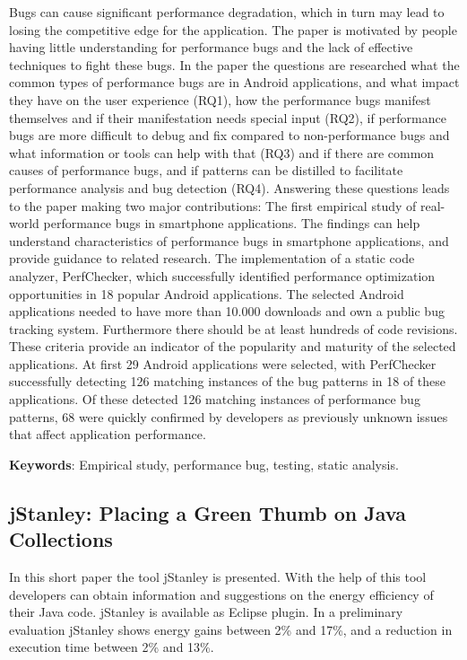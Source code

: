 \documentclass[]{book}
\begin{document}
Bugs can cause significant performance degradation, which in turn may
lead to losing the competitive edge for the application. The paper is
motivated by people having little understanding for performance bugs and
the lack of effective techniques to fight these bugs. In the paper the
questions are researched what the common types of performance bugs are
in Android applications, and what impact they have on the user
experience (RQ1), how the performance bugs manifest themselves and if
their manifestation needs special input (RQ2), if performance bugs are
more difficult to debug and fix compared to non-performance bugs and
what information or tools can help with that (RQ3) and if there are
common causes of performance bugs, and if patterns can be distilled to
facilitate performance analysis and bug detection (RQ4). Answering these
questions leads to the paper making two major contributions: The first
empirical study of real-world performance bugs in smartphone
applications. The findings can help understand characteristics of
performance bugs in smartphone applications, and provide guidance to
related research. The implementation of a static code analyzer,
PerfChecker, which successfully identified performance optimization
opportunities in 18 popular Android applications. The selected Android
applications needed to have more than 10.000 downloads and own a public
bug tracking system. Furthermore there should be at least hundreds of
code revisions. These criteria provide an indicator of the popularity
and maturity of the selected applications. At first 29 Android
applications were selected, with PerfChecker successfully detecting 126
matching instances of the bug patterns in 18 of these applications. Of
these detected 126 matching instances of performance bug patterns, 68
were quickly confirmed by developers as previously unknown issues that
affect application performance.

\textbf{Keywords}: Empirical study, performance bug, testing, static
analysis.

\subsection{jStanley: Placing a Green Thumb on Java
Collections}\label{jstanley-placing-a-green-thumb-on-java-collections}

In this short paper the tool jStanley is presented. With the help of
this tool developers can obtain information and suggestions on the
energy efficiency of their Java code. jStanley is available as Eclipse
plugin. In a preliminary evaluation jStanley shows energy gains between
2\% and 17\%, and a reduction in execution time between 2\% and 13\%.
\end{document}
